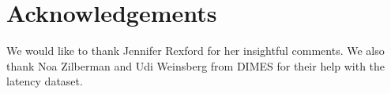 \section*{Acknowledgements}
We would like to thank Jennifer Rexford for her insightful comments. We also thank Noa Zilberman and Udi Weinsberg from DIMES for their help with the latency dataset. 